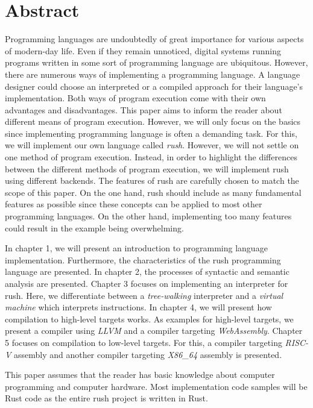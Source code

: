\chapter*{Abstract}

Programming languages are undoubtedly of great importance for various aspects of
modern-day life. Even if they remain unnoticed, digital systems running programs
written in some sort of programming language are ubiquitous.
However, there are numerous ways of implementing a programming language. A
language designer could choose an interpreted or a compiled approach for their
language's implementation. Both ways of program execution come with their own
advantages and disadvantages.
\newline
This paper aims to inform the reader about different means of program execution.
However, we will only focus on the basics since implementing programming language is often a demanding task.
For this, we will implement our own language called \emph{rush}.
However, we will not settle on one method of program execution. Instead, in
order to highlight the differences between the different methods of program
execution, we will implement rush using different backends.
The features of rush are carefully chosen to match the scope of this paper.
On the one hand, rush should include as many fundamental features as possible since these concepts can be applied to most other programming languages.
On the other hand, implementing too many features could result in the example being overwhelming.

In chapter 1, we will present an introduction to programming language implementation.
Furthermore, the characteristics of the rush programming language are presented.
In chapter 2, the processes of syntactic and semantic analysis are presented.
Chapter 3 focuses on implementing an interpreter for rush.
Here, we differentiate between a \emph{tree-walking} interpreter and a \emph{virtual machine} which interprets instructions.
In chapter 4, we will present how compilation to high-level targets works.
As examples for high-level targets, we present a compiler using \emph{LLVM} and a
compiler targeting \emph{WebAssembly}.
Chapter 5 focuses on compilation to low-level targets.
For this, a compiler targeting \emph{RISC-V} assembly and another compiler targeting \emph{X86\_64} assembly is presented.

This paper assumes that the reader has basic knowledge about computer programming and computer hardware.
Most implementation code samples will be Rust code as the entire rush project is written in Rust.
